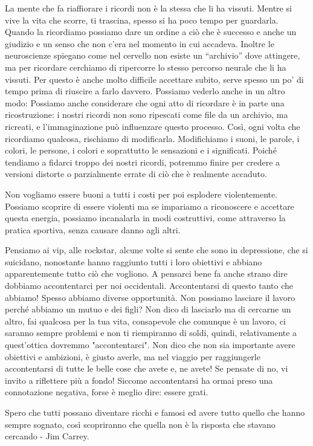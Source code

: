 \documentclass[12pt]{book} %
\begin{document}
La mente che fa riaffiorare i ricordi non è la stessa che li ha vissuti. 
Mentre si vive la vita che scorre, ti trascina, spesso si ha poco tempo per guardarla. 
Quando la ricordiamo possiamo dare un ordine a ciò che è successo e anche un giudizio e un senso che non
c'era nel momento in cui accadeva. Inoltre le neuroscienze spiegano come nel cervello non esiste
un “archivio” dove attingere, ma per ricordare cerchiamo di ripercorre lo stesso percorso neurale che li ha vissuti.
Per questo è anche molto difficile accettare subito, serve spesso un po' di tempo prima di
riuscire a farlo davvero. Possiamo vederlo anche in un altro modo: Possiamo anche considerare che ogni atto di ricordare è in parte una ricostruzione: i nostri ricordi non sono ripescati come file da un archivio, ma ricreati, e l’immaginazione può influenzare questo processo. Così, ogni volta che ricordiamo qualcosa, rischiamo di modificarla. Modifichiamo i suoni, le
parole, i colori, le persone, i colori e soprattutto le sensazioni e i significati. Poiché tendiamo a fidarci troppo dei nostri ricordi, potremmo finire per credere a versioni distorte o parzialmente errate di ciò che è realmente accaduto.

Non vogliamo essere buoni a tutti i costi per poi esplodere violentemente.
Possiamo scoprire di essere violenti ma se impariamo a riconoscere e accettare questa energia, possiamo incanalarla in modi costruttivi, come attraverso la pratica sportiva, senza causare danno agli altri.

Pensiamo ai vip, alle rockstar, alcune volte si sente che sono in depressione, che si suicidano, nonostante hanno
raggiunto tutti i loro obiettivi e abbiano apparentemente tutto ciò che vogliono. A pensarci bene fa anche strano dire dobbiamo accontentarci per noi
occidentali. Accontentarsi di questo tanto che abbiamo!
Spesso abbiamo diverse opportunità. Non possiamo lasciare il lavoro perché abbiamo un mutuo e dei figli? Non dico di
lasciarlo ma di cercarne un altro, fai qualcosa per la tua vita, consapevole che comunque è un lavoro, ci saranno
sempre problemi e non ti riempiranno di soldi, quindi, relativamente a quest'ottica dovremmo "accontentarci". Non dico che non sia importante avere obiettivi e ambizioni, è giusto averle, ma nel viaggio per
raggiungerle accontentarsi di tutte le belle cose che avete e, ne avete! Se pensate di no, vi invito a riflettere più a fondo! Siccome accontentarsi ha ormai preso una connotazione negativa, forse è meglio dire: essere grati.

Spero che tutti possano diventare ricchi e famosi ed avere tutto quello che hanno sempre sognato, così scopriranno che
quella non è la risposta che stavano cercando - Jim Carrey.
\end{document}
